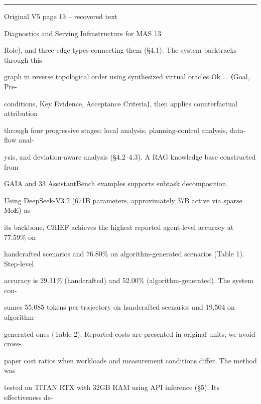 \par\smallskip\noindent\rule{\textwidth}{0.4pt}\par{\sffamily\footnotesize Original V5 page 13 -- recovered text}\par\begin{flushleft}\footnotesize\ttfamily
\par\smallskip
\par\smallskip
\noindent Diagnostics and Serving Infrastructure for MAS 13\par
\par\smallskip
\par\smallskip
\par\smallskip
\noindent  Role), and three edge types connecting them (§4.1). The system backtracks through this\par
\noindent  graph in reverse topological order using synthesized virtual oracles Ok = ⟨Goal, Pre-\par
\noindent  conditions, Key Evidence, Acceptance Criteria⟩, then applies counterfactual attribution\par
\noindent  through four progressive stages: local analysis, planning-control analysis, data-flow anal-\par
\noindent  ysis, and deviation-aware analysis (§4.2–4.3). A RAG knowledge base constructed from\par
{} GAIA and 33 AssistantBench examples supports subtask decomposition.\par
\noindent  Using DeepSeek-V3.2 (671B parameters, approximately 37B active via sparse MoE) as\par
\noindent  its backbone, CHIEF achieves the highest reported agent-level accuracy at 77.59\% on\par
\noindent  handcrafted scenarios and 76.80\% on algorithm-generated scenarios (Table 1). Step-level\par
\noindent  accuracy is 29.31\% (handcrafted) and 52.00\% (algorithm-generated). The system con-\par
\noindent  sumes 55,085 tokens per trajectory on handcrafted scenarios and 19,504 on algorithm-\par
\noindent  generated ones (Table 2). Reported costs are presented in original units; we avoid cross-\par
\noindent  paper cost ratios when workloads and measurement conditions differ. The method was\par
\noindent  tested on TITAN RTX with 32GB RAM using API inference (§5). Its effectiveness de-\par

\end{flushleft}
